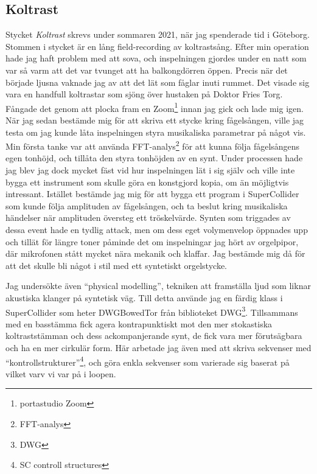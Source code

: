 \documentclass{article}
\begin{document}
	\subsection{Koltrast}
	Stycket \emph{Koltrast} skrevs under sommaren 2021, när jag spenderade tid i Göteborg. Stommen i stycket
	är en lång field-recording av koltrastsång. Efter min operation hade jag haft problem med att sova, och
	inspelningen gjordes under en natt som var så varm att det var tvunget att ha balkongdörren öppen. Precis
	när det började ljusna vaknade jag av att det lät som fåglar inuti rummet. Det visade sig vara en handfull
	koltrastar som sjöng över hustaken på Doktor Fries Torg. Fångade det genom att plocka fram en
	Zoom\footnote{portastudio Zoom} innan jag gick och lade mig igen. När jag sedan bestämde mig för att
	skriva ett stycke kring fågelsången, ville jag testa om jag kunde låta inspelningen styra musikaliska
	parametrar på något vis. Min första tanke var att använda FFT-analys\footnote{FFT-analys} för att kunna
	följa fågelsångens egen tonhöjd, och tillåta den styra tonhöjden av en synt. Under processen hade jag blev
	jag dock mycket fäst vid hur inspelningen lät i sig själv och ville inte bygga ett instrument som skulle
	göra en konstgjord kopia, om än möjligtvis intressant. Istället bestämde jag mig för att bygga ett program
	i SuperCollider som kunde följa amplituden av fågelsången, och ta beslut kring musikaliska händelser när
	amplituden översteg ett tröskelvärde. Synten som triggades av dessa event hade en tydlig attack, men om
	dess eget volymenvelop öppnades upp och tillät för längre toner påminde det om inspelningar jag hört av
	orgelpipor, där mikrofonen stått mycket nära mekanik och klaffar. Jag bestämde mig då för att det skulle
	bli något i stil med ett syntetiskt orgelstycke.


	Jag undersökte även ``physical modelling'', tekniken att framställa ljud som liknar akustiska klanger på
	syntetisk väg. Till detta använde jag en färdig klass i SuperCollider som heter DWGBowedTor från
	biblioteket DWG\footnote{DWG}. Tillsammans med en basstämma fick agera kontrapunktiskt mot den mer
	stokastiska koltraststämman och dess ackompanjerande synt, de fick vara mer förutsägbara och ha en mer
	cirkulär form. Här arbetade jag även med att skriva sekvenser med ``kontrollstrukturer''\footnote{SC
	controll structures}, och göra enkla sekvenser som varierade sig baserat på vilket varv vi var på i
	loopen. 
	\pagebreak
\end{document}

